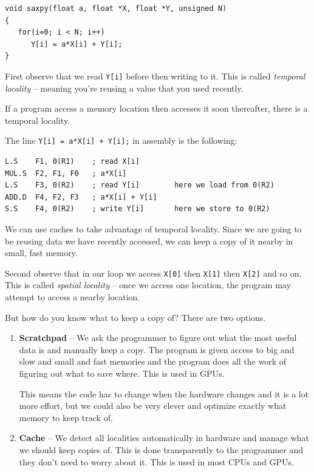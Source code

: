 \documentclass{article}
\begin{document}
\begin{verbatim}
void saxpy(float a, float *X, float *Y, unsigned N)
{
   for(i=0; i < N; i++)
      Y[i] = a*X[i] + Y[i];
}
\end{verbatim}

First observe that we read \verb|Y[i]| before then writing to it. This is called \textit{temporal locality} -- meaning you're reusing a value that you used recently. 

If a program access a memory location then accesses it soon thereafter, there is a temporal locality.

The line \verb|Y[i] = a*X[i] + Y[i];| in assembly is the following:

\begin{verbatim}
L.S    F1, 0(R1)    ; read X[i]
MUL.S  F2, F1, F0   ; a*X[i]
L.S    F3, 0(R2)    ; read Y[i]        here we load from 0(R2)
ADD.D  F4, F2, F3   ; a*X[i] + Y[i]
S.S    F4, 0(R2)    ; write Y[i]       here we store to 0(R2)
\end{verbatim}

We can use caches to take advantage of temporal locality. Since we are going to be reusing data we have recently accessed, we can keep a copy of it nearby in small, fast memory.

Second observe that in our loop we access \verb|X[0]| then \verb|X[1]| then \verb|X[2]| and so on. This is called \textit{spatial locality} -- once we access one location, the program may attempt to access a nearby location.



But how do you know what to keep a copy of? There are two options.

\begin{enumerate}
\item \textbf{Scratchpad} -- We ask the programmer to figure out what the most useful data is and manually keep a copy. The program is given access to big and slow and small and fast memories and the program does all the work of figuring out what to save where. This is used in GPUs. 

This means the code has to change when the hardware changes and it is a lot more effort, but we could also be very clever and optimize exactly what memory to keep track of.

\item \textbf{Cache} -- We detect all localities automatically in hardware and manage what we should keep copies of. This is done transparently to the programmer and they don't need to worry about it. This is used in most CPUs and GPUs.
\end{enumerate}
\end{document}
